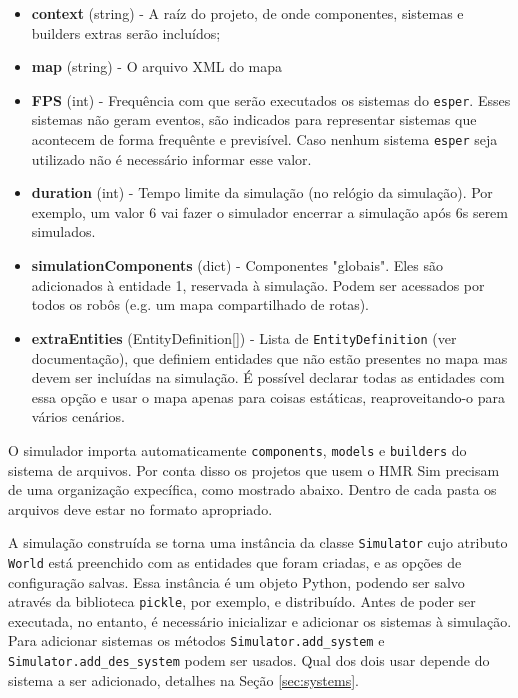 \begin{itemize}
    \item \textbf{context} (string) - A raíz do projeto, de onde componentes, sistemas e builders extras serão incluídos;
    \item \textbf{map} (string) - O arquivo XML do mapa
    \item \textbf{FPS} (int) - Frequência com que serão executados os sistemas do \texttt{esper}. Esses sistemas não geram eventos, são indicados para representar sistemas que acontecem de forma frequênte e previsível. Caso nenhum sistema \texttt{esper} seja utilizado não é necessário informar esse valor.
    \item \textbf{duration} (int) - Tempo limite da simulação (no relógio da simulação). Por exemplo, um valor 6 vai fazer o simulador encerrar a simulação após 6s serem simulados.
    \item \textbf{simulationComponents} (dict) - Componentes "globais". Eles são adicionados à entidade 1, reservada à simulação. Podem ser acessados por todos os robôs (e.g. um mapa compartilhado de rotas).
    \item \textbf{extraEntities} (EntityDefinition[]) - Lista de \texttt{EntityDefinition} (ver documentação), que definiem entidades que não estão presentes no mapa mas devem ser incluídas na simulação. É possível declarar todas as entidades com essa opção e usar o mapa apenas para coisas estáticas, reaproveitando-o para vários cenários. 
\end{itemize}

O simulador importa automaticamente \texttt{components}, \texttt{models} e \texttt{builders} do sistema de arquivos. Por conta disso os projetos que usem o HMR Sim precisam de uma organização expecífica, como mostrado abaixo. Dentro de cada pasta os arquivos deve estar no formato apropriado.


A simulação construída se torna uma instância da classe \texttt{Simulator} cujo atributo \texttt{World} está preenchido com as entidades que foram criadas, e as opções de configuração salvas. Essa instância é um objeto Python, podendo ser salvo através da biblioteca \texttt{pickle}, por exemplo, e distribuído. Antes de poder ser executada, no entanto, é necessário inicializar e adicionar os sistemas à simulação. Para adicionar sistemas os métodos \texttt{Simulator.add\_system} e \texttt{Simulator.add\_des\_system} podem ser usados. Qual dos dois usar depende do sistema a ser adicionado, detalhes na Seção \ref{sec:systems}.

